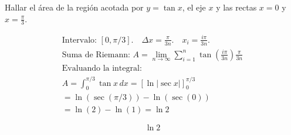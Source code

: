 Hallar el área de la región acotada por $y=\tan x$, el eje $x$ y las rectas $x=0$ y $x=\frac{\pi}{3}$.

\nopagebreak
\begin{align*}
\text{Intervalo: } [0, \pi/3]. \quad \Delta x = \frac{\pi}{3n}. \quad x_i = \frac{i\pi}{3n}. \\
\text{Suma de Riemann: } A = \lim_{n \to \infty} \sum_{i=1}^{n} \tan\left(\frac{i\pi}{3n}\right) \frac{\pi}{3n} \\
\text{Evaluando la integral:} \\
A = \int_{0}^{\pi/3} \tan x \, dx = \left[ \ln|\sec x| \right]_{0}^{\pi/3} \\
= \ln(\sec(\pi/3)) - \ln(\sec(0)) \\
= \ln(2) - \ln(1) = \ln 2
\end{align*}

\[
\boxed{\displaystyle \ln 2}
\]
